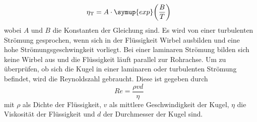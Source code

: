 \begin{equation*}
\eta_{\text{T}}=A\cdot \symup{exp}\biggl(\frac{B}{T}\biggr)
\end{equation*}
wobei $A$ und $B$ die Konstanten der Gleichung sind. 
Es wird von einer turbulenten Strömung gesprochen, wenn sich in der Flüssigkeit Wirbel ausbilden und eine hohe Strömungsgeschwingkeit vorliegt. Bei einer laminaren Strömung bilden sich keine Wirbel 
aus und die Flüssigkeit läuft parallel zur Rohrachse. Um zu überprüfen, ob sich die Kugel in einer laminaren oder turbulenten Strömung befindet, wird die Reynoldszahl gebraucht. Diese ist gegeben durch
\begin{equation}
\label{eqn:Reynolds}
Re = \frac{\rho v d}{\eta}
\end{equation}
mit $\rho$ als Dichte der Flüssigkeit, $v$ als mittlere Geschwindigkeit der Kugel, $\eta$ die Viskosität der Flüssigkeit und $d$ der Durchmesser der Kugel sind. 
